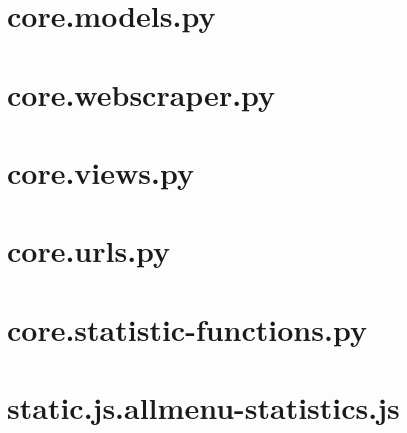 \section{core.models.py}\label{code:core.models.py}

\section{core.webscraper.py}\label{code:core.webscraper.py}

\section{core.views.py}\label{code:core.views.py}

\section{core.urls.py}\label{code:core.urls.py}

\section{core.statistic-functions.py}\label{code:core.statistic-functions.py}

\section{static.js.allmenu-statistics.js}\label{code:static.js.allmenu-statistics.js}

